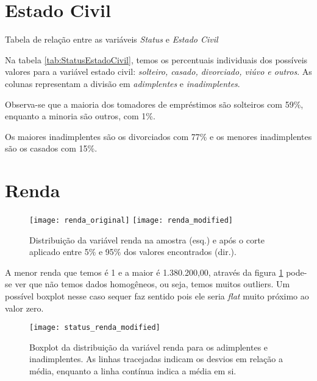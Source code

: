 \clearpage

\section{Estado Civil}

\begin{table}[h]
\centering

\caption{\label{tab:StatusEstadoCivil}Tabela de relação entre as variáveis \emph{Status
}e \emph{Estado Civil}}
\end{table}

Na tabela \ref{tab:StatusEstadoCivil}, temos os percentuais individuais dos possíveis valores para a variável estado civil: \emph{solteiro, casado, divorciado, viúvo e outros}. As colunas representam a divisão em \emph{adimplentes} e \emph{inadimplentes}.

Observa-se que a maioria dos tomadores de empréstimos são solteiros com 59\%, enquanto a minoria são outros, com 1\%.

Os maiores inadimplentes são os divorciados com 77\% e os menores inadimplentes são os casados com 15\%.

\clearpage

\section{Renda}

\begin{center}
\begin{figure}[h]
\begin{centering}
\texttt{[image: renda\_original]}
\texttt{[image: renda\_modified]}
\par\end{centering}
\caption{\label{fig:RendaOriginal}Distribuição da variável renda na amostra (esq.) e após o corte aplicado entre 5\% e 95\% dos valores encontrados (dir.).}
\end{figure}
\vspace*{-40pt}
\par\end{center}

A menor renda que temos é 1 e a maior é 1.380.200,00, através da figura \ref{fig:RendaOriginal}
pode-se ver que não temos dados homogêneos, ou seja, temos muitos outliers. Um possível boxplot nesse caso sequer faz sentido
pois ele seria \emph{flat} muito próximo ao valor zero.

\begin{center}
\begin{figure}
\begin{centering}
\texttt{[image: status\_renda\_modified]}
\par\end{centering}
\caption{\label{fig:StatusRendaMod}Boxplot da distribuição da variável renda para os adimplentes e inadimplentes. As linhas tracejadas indicam os desvios em relação a média, enquanto a linha contínua indica a média em si.}
\end{figure}
\vspace*{-40pt}
\par\end{center}


